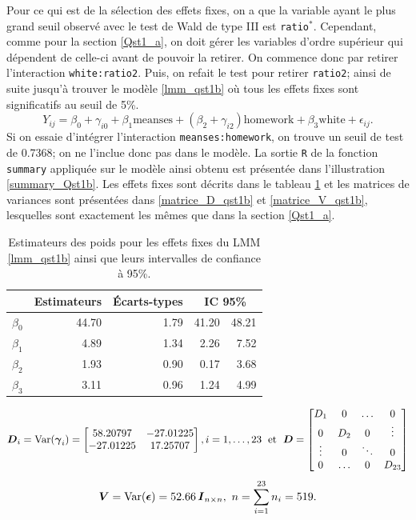 \documentclass{article}
\begin{document}
		Pour ce qui est de la sélection des effets fixes, on a que la variable ayant le plus grand seuil observé avec le test de Wald de type III est \texttt{ratio}$^*$. Cependant, comme pour la section \ref{Qst1_a}, on doit gérer les variables d'ordre supérieur qui dépendent de celle-ci avant de pouvoir la retirer. On commence donc par retirer l'interaction \texttt{white:ratio2}. Puis, on refait le test pour retirer \texttt{ratio2}; ainsi de suite jusqu'à trouver le modèle \eqref{lmm_qst1b} où tous les effets fixes sont significatifs au seuil de 5\%.
		\begin{equation}\label{lmm_qst1b}
			Y_{ij} = \beta_0 + \gamma_{i0} + \beta_1 \mathrm{meanses} + (\beta_2 + \gamma_{i2}) \mathrm{homework} + \beta_3\mathrm{white} + \epsilon_{ij}.
		\end{equation}
		Si on essaie d'intégrer l'interaction \texttt{meanses:homework}, on trouve un seuil de test de 0.7368; on ne l'inclue donc pas dans le modèle.		
		La sortie \texttt{R} de la fonction \texttt{summary} appliquée sur le modèle ainsi obtenu est présentée dans l'illustration \ref{summary_Qst1b}. Les effets fixes sont décrits dans le tableau \ref{tbl_effets_fixes_qst1b} et les matrices de variances sont présentées dans \eqref{matrice_D_qst1b} et \eqref{matrice_V_qst1b}, lesquelles sont exactement les mêmes que dans la section \ref{Qst1_a}.
		\begin{table}[ht]
			\centering
			\begin{tabular}{lrrrr}
				\hline
				& Estimateurs & Écarts-types &  \multicolumn{2}{c}{IC 95\%} \\ 
				\hline
				$\beta_0$ & 44.70 & 1.79 & 41.20 & 48.21 \\ 
				$\beta_1$ & 4.89 & 1.34 & 2.26 & 7.52 \\ 
				$\beta_2$ & 1.93 & 0.90 & 0.17 & 3.68 \\ 
				$\beta_3$ & 3.11 & 0.96 & 1.24 & 4.99 \\ 
				\hline
			\end{tabular}
		\caption{Estimateurs des poids pour les effets fixes du LMM \eqref{lmm_qst1b} ainsi que leurs intervalles de confiance à 95\%.}
		\label{tbl_effets_fixes_qst1b}
		\end{table}
		\begin{align}\label{matrice_D_qst1b}
			\boldsymbol{D}_i = \mathrm{Var}(\boldsymbol{\gamma}_i) = 
			\begin{bmatrix}
				58.20797 & -27.01225 \\
				-27.01225& 17.25707  \\
			\end{bmatrix},
			i=1,\dots,23
			\; \text{ et }\;
			\boldsymbol{D} = 
			\begin{bmatrix}
				D_1 & 0 & \dots & 0 \\
				0 & D_2 & 0 & \vdots \\
				\vdots & 0 & \ddots & 0 \\
				0 & \dots & 0 & D_{23}
			\end{bmatrix}
		\end{align}
		\begin{align}\label{matrice_V_qst1b}
			\boldsymbol{V} = \mathrm{Var}(\boldsymbol{\epsilon}) = 
			52.66\, \boldsymbol{I}_{n\times n},
			\ n=\sum_{i=1}^{23} n_i = 519.
		\end{align}
\end{document}
